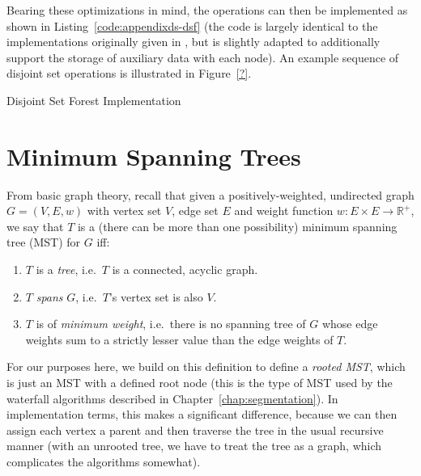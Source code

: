 \noindent Bearing these optimizations in mind, the operations can then be implemented as shown in Listing~\ref{code:appendixds-dsf} (the code is largely identical to the implementations originally given in \cite{worrell06}, but is slightly adapted to additionally support the storage of auxiliary data with each node). An example sequence of disjoint set operations is illustrated in Figure~\ref{?}.

\begin{stulisting}[p]
\caption{Disjoint Set Forest Implementation}
\label{code:appendixds-dsf}

\end{stulisting}


\newpage

\section{Minimum Spanning Trees}

From basic graph theory, recall that given a positively-weighted, undirected graph $G = (V,E,w)$ with vertex set $V$, edge set $E$ and weight function $w: E \times E \to \mathbb{R}^+$, we say that $T$ is a (there can be more than one possibility) minimum spanning tree (MST) for $G$ iff:
%
\begin{enumerate}
\item $T$ is a \emph{tree}, i.e.~$T$ is a connected, acyclic graph.
\item $T$ \emph{spans} $G$, i.e.~$T$'s vertex set is also $V$.
\item $T$ is of \emph{minimum weight}, i.e.~there is no spanning tree of $G$ whose edge weights sum to a strictly lesser value than the edge weights of $T$.
\end{enumerate}
%
For our purposes here, we build on this definition to define a \emph{rooted MST}, which is just an MST with a defined root node (this is the type of MST used by the waterfall algorithms described in Chapter~\ref{chap:segmentation}). In implementation terms, this makes a significant difference, because we can then assign each vertex a parent and then traverse the tree in the usual recursive manner (with an unrooted tree, we have to treat the tree as a graph, which complicates the algorithms somewhat).


